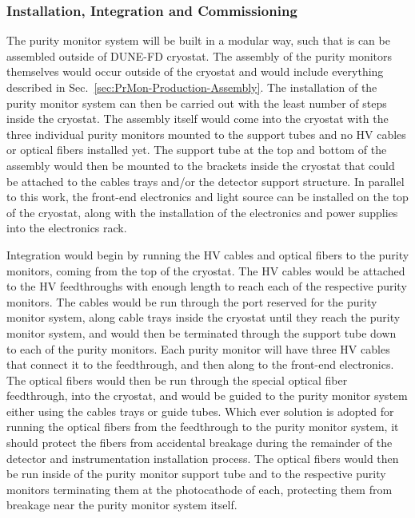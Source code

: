 \subsubsection{Installation, Integration and Commissioning}
\label{sec:PrMon-Install-Integrate-Commission}
The purity monitor system will be built in a modular way, such that is can be assembled outside of DUNE-FD cryostat.  The assembly of the purity monitors themselves would occur outside of the cryostat and would include everything described in Sec.~\ref{sec:PrMon-Production-Assembly}.  The installation of the purity monitor system can then be carried out with the least number of steps inside the cryostat.  The assembly itself would come into the cryostat with the three individual purity monitors mounted to the support tubes and no HV cables or optical fibers installed yet.  The support tube at the top and bottom of the assembly would then be mounted to the brackets inside the cryostat that could be attached to the cables trays and/or the detector support structure.  In parallel to this work, the front-end electronics and light source can be installed on the top of the cryostat, along with the installation of the electronics and power supplies into the electronics rack.  

Integration would begin by running the HV cables and optical fibers to the purity monitors, coming from the top of the cryostat.  The HV cables would be attached to the HV feedthroughs with enough length to reach each of the respective purity monitors.  The cables would be run through the port reserved for the purity monitor system, along cable trays inside the cryostat until they reach the purity monitor system, and would then be terminated through the support tube down to each of the purity monitors.  Each purity monitor will have three HV cables that connect it to the feedthrough, and then along to the front-end electronics.  The optical fibers would then be run through the special optical fiber feedthrough, into the cryostat, and would be guided to the purity monitor system either using the cables trays or guide tubes.  Which ever solution is adopted for running the optical fibers from the feedthrough to the purity monitor system, it should protect the fibers from accidental breakage during the remainder of the detector and instrumentation installation process.  The optical fibers would then be run inside of the purity monitor support tube and to the respective purity monitors terminating them at the photocathode of each, protecting them from breakage near the purity monitor system itself.

